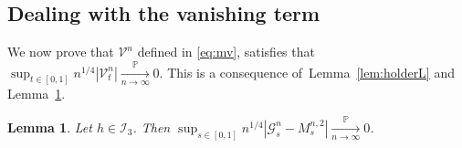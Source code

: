 \documentclass[12pt]{article}
\numberwithin{equation}{section}
\newtheorem{lemma}{Lemma}
\theoremstyle{definition}
\theoremstyle{remark}
\newcommand{\convp}[1][]{\xrightarrow[#1]{\PP}}
\newcommand{\PP}{\mathbb{P}}
\newcommand{\cF}{\mathcal{F}}
\newcommand{\cG}{\mathcal{G}}
\newcommand{\Lg}[1]{\mathcal{I}_{#1}}
\begin{document}
\subsection{Dealing with the vanishing term} \label{sec:th:j2:vanish}

We now prove that $\mathcal{V}^n$ defined in \eqref{eq:mv}, satisfies that $\sup_{t\in [0,1]} n^{1/4} |\mathcal{V}^n_t| \convp[n\to\infty] 0$.
This is a consequence of~Lemma~\ref{lem:holderL} and Lemma~\ref{lem:j1:5.2}.

\begin{lemma} \label{lem:j1:5.2}
Let $h\in \Lg{3}$.
Then 
 $\sup_{s\in [0,1]} n^{1/4} |\cG^n_s-M^{n,2}_s| \convp[n\to\infty] 0$.
\end{lemma}
%
%
%
\end{document}
